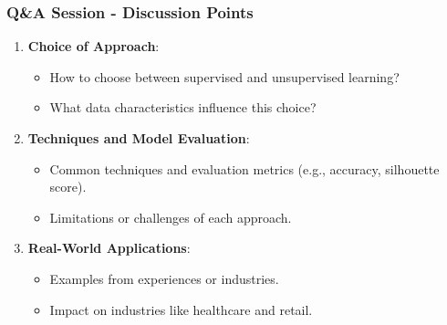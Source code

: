\documentclass[aspectratio=169]{beamer}
\begin{document}
\begin{frame}[fragile]
    \frametitle{Q\&A Session - Discussion Points}
    \begin{enumerate}
        \item \textbf{Choice of Approach}:
            \begin{itemize}
                \item How to choose between supervised and unsupervised learning?
                \item What data characteristics influence this choice?
            \end{itemize}

        \item \textbf{Techniques and Model Evaluation}:
            \begin{itemize}
                \item Common techniques and evaluation metrics (e.g., accuracy, silhouette score).
                \item Limitations or challenges of each approach.
            \end{itemize}

        \item \textbf{Real-World Applications}:
            \begin{itemize}
                \item Examples from experiences or industries.
                \item Impact on industries like healthcare and retail.
            \end{itemize}
    \end{enumerate}
\end{frame}
\end{document}
